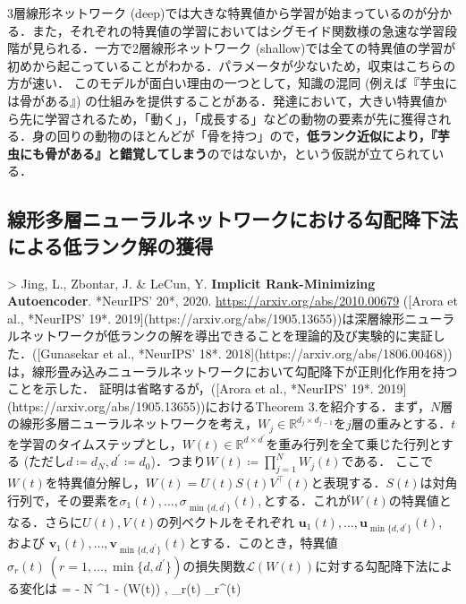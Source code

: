 3層線形ネットワーク (deep)では大きな特異値から学習が始まっているのが分かる．また，それぞれの特異値の学習においてはシグモイド関数様の急速な学習段階が見られる．一方で2層線形ネットワーク (shallow)では全ての特異値の学習が初めから起こっていることがわかる．パラメータが少ないため，収束はこちらの方が速い．
このモデルが面白い理由の一つとして，知識の混同 (例えば『芋虫には骨がある』) の仕組みを提供することがある．発達において，大きい特異値から先に学習されるため，「動く」，「成長する」などの動物の要素が先に獲得される．身の回りの動物のほとんどが「骨を持つ」ので，\textbf{低ランク近似により，『芋虫にも骨がある』と錯覚してしまう}のではないか，という仮説が立てられている．
\subsection{線形多層ニューラルネットワークにおける勾配降下法による低ランク解の獲得}
> Jing, L., Zbontar, J. & LeCun, Y. \textbf{Implicit Rank-Minimizing Autoencoder}. *NeurIPS' 20*, 2020. \url{https://arxiv.org/abs/2010.00679}
([Arora et al., *NeurIPS' 19*. 2019](https://arxiv.org/abs/1905.13655))は深層線形ニューラルネットワークが低ランクの解を導出できることを理論的及び実験的に実証した．([Gunasekar et al., *NeurIPS' 18*. 2018](https://arxiv.org/abs/1806.00468))は，線形畳み込みニューラルネットワークにおいて勾配降下が正則化作用を持つことを示した．
証明は省略するが，([Arora et al., *NeurIPS' 19*. 2019](https://arxiv.org/abs/1905.13655))におけるTheorem 3.を紹介する．まず，$N$層の線形多層ニューラルネットワークを考え，$W_j \in \mathbb{R}^{d_j \times d_{j−1}}$を$j$層の重みとする．$t$を学習のタイムステップとし，$W(t) \in \mathbb{R}^{d \times d^\prime}$を重み行列を全て乗じた行列とする (ただし$d \coloneqq  d_N, d^\prime \coloneqq  d_0$)．つまり$W(t)\coloneqq \prod_{j=1}^N W_j(t)$である．
ここで$W(t)$を特異値分解し，$W(t) = U(t)S(t)V^\top(t)$と表現する．$S(t)$は対角行列で，その要素を$\sigma_1(t), \ldots , \sigma_{\min\{d, d^\prime\}}(t),$とする．これが$W(t)$の特異値となる．さらに$U(t), V (t)$の列ベクトルをそれぞれ $\mathbf{u}_1(t), \ldots, \mathbf{u}_{\min\{d, d^\prime\}}(t)$, および $\mathbf{v}_1(t), \ldots, \mathbf{v}_{\min\{d,d^\prime \}}(t)$とする．このとき，特異値$ \sigma_r(t)\ (r=1, \ldots, \min\{d,d^\prime \})$の損失関数$\mathcal{L}(W(t))$に対する勾配降下法による変化は
 = - N \cdot {}^{1 - } \cdot \left\langle \nabla {}(W(t)) , _r(t) _r^\top(t) \right\rangle
